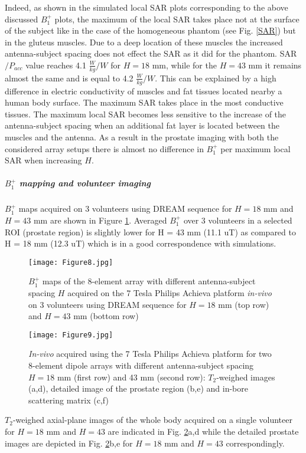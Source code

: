 \documentclass[fleqn,10pt]{wlscirep}
\begin{document}
Indeed, as shown in the simulated local SAR plots corresponding to the above discussed $B_1^{+}$ plots, the maximum of the local SAR takes place not at the surface of the subject like in the case of the homogeneous phantom (see Fig. \ref{SAR}) but in the gluteus muscles. Due to a deep location of these muscles the increased antenna-subject spacing does not effect the SAR as it did for the phantom. SAR$/P_{acc}$ value reaches 4.1 $\frac{W}{kg}/W$ for $H=18$ mm, while for the $H=43$ mm it remains almost the same and is equal to 4.2 $\frac{W}{kg}/W$. This can be explained by a high difference in electric conductivity of muscles and fat tissues located nearby a human body surface. The maximum SAR takes place in the most conductive tissues. The maximum local SAR becomes less sensitive to the increase of the antenna-subject spacing when an additional fat layer is located between the muscles and the antenna. As a result in the prostate imaging with both the considered array setups there is almost no difference in $B_1^{+}$ per maximum local SAR when increasing $H$.   

\subparagraph*{$B_1^{+}$ mapping and volunteer imaging}

$B_1^{+}$ maps acquired on 3 volunteers using DREAM sequence for $H=18$ mm and $H=43$ mm are shown in Figure \ref{3volunteers}. Averaged $B_1^{+}$ over 3 volunteers in a selected ROI (prostate region) is slightly lower for H = 43 mm (11.1 uT) as compared to H = 18 mm (12.3 uT) which is in a good correspondence with simulations.
%
\begin{figure}[t]
\center
\texttt{[image: Figure8.jpg]}
\caption{$B_1^{+}$ maps of the 8-element array with different antenna-subject spacing $H$ acquired on the 7 Tesla Philips Achieva platform \textit{in-vivo} on 3 volunteers using DREAM sequence for $H=18$ mm (top row) and $H=43$ mm (bottom row)}
\label{3volunteers}
\end{figure}
%
\begin{figure}[ht]
\center
\texttt{[image: Figure9.jpg]}
\caption{\textit{In-vivo} acquired using the 7 Tesla Philips Achieva platform for two 8-element dipole arrays with different antenna-subject spacing $H=18$ mm (first row) and 43 mm (second row): $T_{2}$-weighed images (a,d), detailed image of the prostate region (b,e) and in-bore scattering matrix (c,f)}
\label{T1w+S}
\end{figure}
%
$T_{2}$-weighed axial-plane images of the whole body acquired on a single volunteer for $H=18$ mm and $H=43$ are indicated in Fig. \ref{T1w+S}a,d while the detailed prostate images are depicted in Fig. \ref{T1w+S}b,e for $H=18$ mm and $H=43$ correspondingly.
\end{document}
